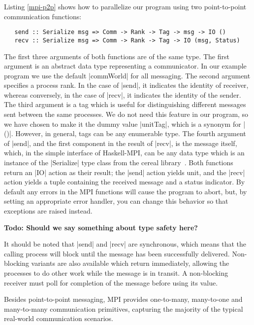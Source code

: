 \documentclass{tmr}
\newcommand{\Todo}[1]{{\textbf{Todo: #1}}}
\begin{document}
Listing \ref{mpi-p2p} shows how to parallelize our program using
two point-to-point communication functions:
\begin{Verbatim}
   send :: Serialize msg => Comm -> Rank -> Tag -> msg -> IO ()
   recv :: Serialize msg => Comm -> Rank -> Tag -> IO (msg, Status)
\end{Verbatim}
The first three arguments of both functions are of the same type.
The first argument is an abstract data
type representing a communicator. In our example program we use
the default |commWorld| for all messaging. The second argument
specifies a process rank. In the case of |send|, it indicates
the identity of receiver, whereas conversely, in the case
of |recv|, it indicates the identity of the sender.
The third argument is a tag which is useful for distinguishing
different messages sent between the same processes.
We do not need this feature in our program, so we have chosen
to make it the dummy value |unitTag|, which is a synonym for |()|.
However, in general, tags can be any enumerable type.
The fourth argument of |send|, and the first component in
the result of |recv|, is the message itself, which,
in the simple interface of Haskell-MPI, can be any
data type which is an instance of the |Serialize| type class
from the cereal library~\cite{cereal}. Both functions return
an |IO| action as their result; the |send| action yields
unit, and the |recv| action yields a tuple containing
the received message and a status indicator.
By default any errors in
the MPI functions will cause the program to abort, but, by
setting an appropriate error handler, you can
change this behavior so that exceptions are raised instead.

\Todo{Should we say something about type safety here?}

It should be noted that |send| and |recv| are synchronous,
which means that the calling process will block until the message has been
successfully delivered. Non-blocking variants are also available which
return immediately, allowing the processes to do other work while
the message is in transit. A non-blocking receiver must poll for
completion of the message before using its value.

Besides point-to-point messaging, MPI
provides one-to-many, many-to-one and many-to-many communication
primitives, capturing the majority of the typical real-world communication
scenarios.
\end{document}
